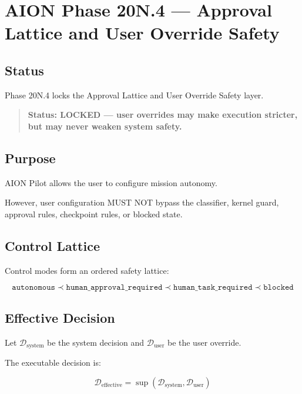 \section{AION Phase 20N.4 --- Approval Lattice and User Override Safety}
\label{sec:aion-phase20n4-approval-lattice-user-override-safety}

\subsection{Status}

Phase 20N.4 locks the Approval Lattice and User Override Safety layer.

\begin{quote}
\textbf{Status: LOCKED --- user overrides may make execution stricter, but may never weaken system safety.}
\end{quote}

\subsection{Purpose}

AION Pilot allows the user to configure mission autonomy.

However, user configuration MUST NOT bypass the classifier, kernel guard, approval rules, checkpoint rules, or blocked state.

\subsection{Control Lattice}

Control modes form an ordered safety lattice:

\begin{equation}
\mathtt{autonomous}
\prec
\mathtt{human\_approval\_required}
\prec
\mathtt{human\_task\_required}
\prec
\mathtt{blocked}
\end{equation}

\subsection{Effective Decision}

Let $\mathcal{D}_{\mathrm{system}}$ be the system decision and $\mathcal{D}_{\mathrm{user}}$ be the user override.

The executable decision is:

\begin{equation}
\mathcal{D}_{\mathrm{effective}}
=
\sup
(
\mathcal{D}_{\mathrm{system}},
\mathcal{D}_{\mathrm{user}}
)
\end{equation}

